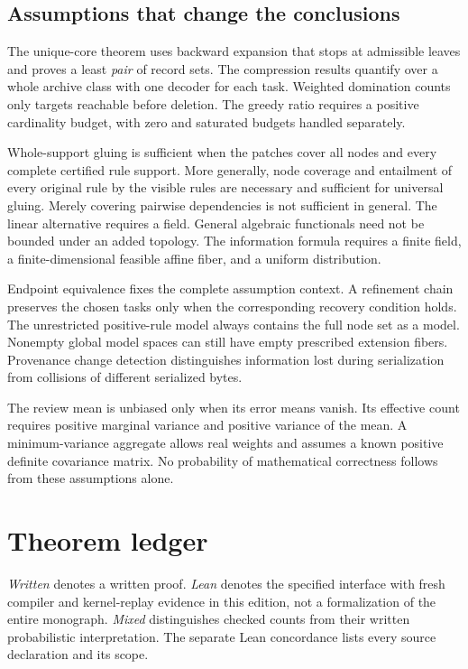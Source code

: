 \documentclass[11pt,oneside,openany]{book}
\numberwithin{equation}{section}
\begin{document}
\subsection*{Assumptions that change the conclusions}
The unique-core theorem uses backward expansion that stops at admissible leaves and proves a least \emph{pair} of record sets. The compression results quantify over a whole archive class with one decoder for each task. Weighted domination counts only targets reachable before deletion. The greedy ratio requires a positive cardinality budget, with zero and saturated budgets handled separately.

Whole-support gluing is sufficient when the patches cover all nodes and every complete certified rule support. More generally, node coverage and entailment of every original rule by the visible rules are necessary and sufficient for universal gluing. Merely covering pairwise dependencies is not sufficient in general. The linear alternative requires a field. General algebraic functionals need not be bounded under an added topology. The information formula requires a finite field, a finite-dimensional feasible affine fiber, and a uniform distribution.

Endpoint equivalence fixes the complete assumption context. A refinement chain preserves the chosen tasks only when the corresponding recovery condition holds. The unrestricted positive-rule model always contains the full node set as a model. Nonempty global model spaces can still have empty prescribed extension fibers. Provenance change detection distinguishes information lost during serialization from collisions of different serialized bytes.

The review mean is unbiased only when its error means vanish. Its effective count requires positive marginal variance and positive variance of the mean. A minimum-variance aggregate allows real weights and assumes a known positive definite covariance matrix. No probability of mathematical correctness follows from these assumptions alone.




\section{Theorem ledger}
\label{PPT:app:ledger}

\emph{Written} denotes a written proof. \emph{Lean} denotes the specified interface with fresh compiler and kernel-replay evidence in this edition, not a formalization of the entire monograph. \emph{Mixed} distinguishes checked counts from their written probabilistic interpretation. The separate Lean concordance lists every source declaration and its scope.
\end{document}
